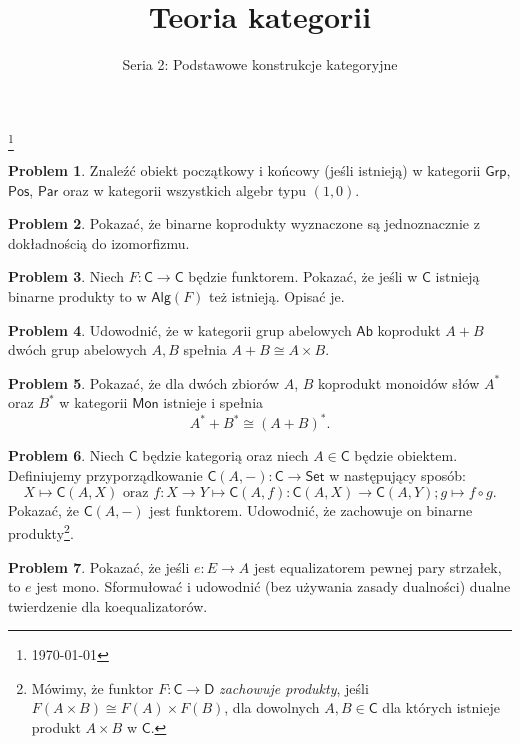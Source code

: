 \documentclass[10pt]{amsart}
\title{Teoria kategorii}
\author{Seria 2: Podstawowe konstrukcje kategoryjne}
\theoremstyle{plain}
\theoremstyle{definition}
\newtheorem{problem}{Problem}
\numberwithin{equation}{section}
\newcommand\blfootnote[1]{%
  \begingroup
  \renewcommand\thefootnote{}\footnote{#1}%
  \addtocounter{footnote}{-1}%
  \endgroup
}
\begin{document}
\maketitle

\blfootnote{\today}


\begin{problem}
Znaleźć obiekt początkowy i końcowy (jeśli istnieją) w kategorii 
$\mathsf{Grp}$, $\mathsf{Pos}$, $\mathsf{Par}$ oraz w kategorii wszystkich algebr typu $(1,0)$. 
\end{problem}


\begin{problem}
Pokazać, że binarne koprodukty wyznaczone są jednoznacznie z dokładnością do izomorfizmu.
\end{problem}

\begin{problem}
Niech $F:\mathsf{C}\to \mathsf{C}$ będzie funktorem. Pokazać, że jeśli w $\mathsf{C}$ istnieją binarne produkty to  w $\mathsf{Alg}(F)$ też istnieją. Opisać je. 
\end{problem}

\begin{problem}
Udowodnić, że w kategorii grup abelowych $\mathsf{Ab}$ koprodukt $A+B$ dwóch grup abelowych $A,B$ spełnia $A+B \cong A\times B$.  
\end{problem}

\begin{problem}
Pokazać, że dla dwóch zbiorów $A$, $B$ koprodukt monoidów słów $A^\ast$ oraz $B^\ast$ w kategorii $\mathsf{Mon}$ istnieje i spełnia 
$$
A^\ast + B^\ast \cong (A+B)^\ast.
$$
\end{problem}


\begin{problem}
Niech $\mathsf{C}$ będzie kategorią oraz niech $A\in \mathsf{C}$ będzie obiektem. Definiujemy przyporządkowanie $\mathsf{C}(A,-):\mathsf{C}\to \mathsf{Set}$ w następujący sposób:
$$
X\mapsto \mathsf{C}(A,X) \text{ oraz } f:X\to Y \mapsto \mathsf{C}(A,f):\mathsf{C}(A,X)\to \mathsf{C}(A,Y);g\mapsto f\circ g. 
$$
Pokazać, że $\mathsf{C}(A,-)$ jest funktorem. Udowodnić, że zachowuje on binarne produkty\footnote{Mówimy, że funktor $F:\mathsf{C}\to\mathsf{D}$ \emph{zachowuje produkty}, jeśli $F(A\times B) \cong F(A)\times F(B)$, dla dowolnych $A,B\in \mathsf{C}$ dla których istnieje produkt $A\times B$ w $\mathsf{C}$.}. 
\end{problem}


\begin{problem}
Pokazać, że jeśli $e:E\to A$ jest equalizatorem pewnej pary strzałek, to $e$ jest mono. Sformułować i udowodnić (bez używania zasady dualności) dualne twierdzenie dla koequalizatorów. 
\end{problem}
\end{document}
